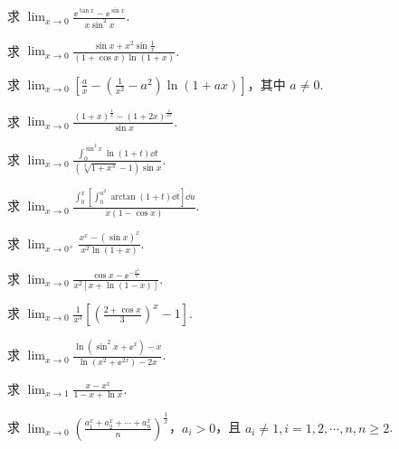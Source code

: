 	\begin{ti}
		求 $\lim_{x \to 0}\frac{\ee^{\tan x} - \ee^{\sin x}}{x \sin^{2} x}$.
	\end{ti}

	\begin{ti}
		求 $\lim_{x \to 0} \frac{\sin x + x^{2} \sin\frac{1}{x}}{(1 + \cos x)\ln(1 + x)}$.
	\end{ti}

	\begin{ti}
		求 $\lim_{x \to 0}\left[ \frac{a}{x} - \left( \frac{1}{x^{2}} - a^{2} \right) \ln(1 + ax) \right]$，其中 $a \ne 0$.
	\end{ti}

	\begin{ti}
		求 $\lim_{x \to 0} \frac{(1 + x)^{\frac{1}{x}} - (1 + 2x)^{\frac{1}{2x}}}{\sin x}$.
	\end{ti}

	\begin{ti}
		求 $\lim_{x \to 0}\frac{\int_{0}^{\sin^{2}x} \ln(1 + t)\dd{t}}{\left( \sqrt[3]{1 + x^{3}} - 1 \right)\sin x}$.
	\end{ti}

	\begin{ti}
		求 $\lim_{x \to 0} \frac{ \int_{0}^{x} \left[ \int_{0}^{u^{2}} \arctan(1 + t) \dd{t} \right] \dd{u} }{x(1 - \cos x)}$.
	\end{ti}

	\begin{ti}
		求 $\lim_{x \to 0^{+}} \frac{x^{x} - ( \sin x )^{x}}{x^{2}\ln(1 + x)}$.
	\end{ti}

	\begin{ti}
		求 $\lim_{x \to 0} \frac{ \cos x - \ee^{-\frac{x^{2}}{2}} }{x^{2} [ x + \ln(1 - x) ]}$.
	\end{ti}

	\begin{ti}
		求 $\lim_{x \to 0} \frac{1}{x^{3}} \left[ \left( \frac{2 + \cos x}{3} \right)^{x} - 1 \right]$.
	\end{ti}

	\begin{ti}
		求 $\lim_{x \to 0} \frac{\ln\left( \sin^{2}x + \ee^{x} \right) - x}{\ln\left( x^{2} + \ee^{2x} \right) - 2x}$.
	\end{ti}

	\begin{ti}
		求 $\lim_{x \to 1} \frac{x - x^{x}}{1 - x + \ln x}$.
	\end{ti}

	\begin{ti}
		求 $\lim_{x \to 0} \left( \frac{a_{1}^{x} + a_{2}^{x} + \cdots + a_{n}^{x}}{n} \right)^{\frac{1}{x}}$，$a_{i} > 0$，且 $a_{i} \ne 1, i = 1,2,\cdots,n,n \geq 2$.
	\end{ti}

